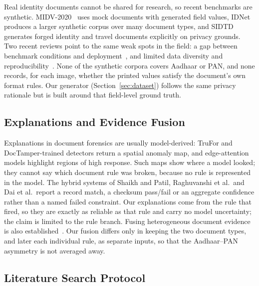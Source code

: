 \documentclass[conference]{IEEEtran}
\begin{document}
Real identity documents cannot be shared for research, so recent
benchmarks are synthetic. MIDV-2020~\cite{midv} uses mock documents with
generated field values, IDNet~\cite{idnet} produces a larger synthetic
corpus over many document types, and SIDTD~\cite{sidtd} generates
forged identity and travel documents explicitly on privacy grounds.
Two recent reviews point to the same weak spots in the field: a gap
between benchmark conditions and deployment~\cite{survey}, and limited
data diversity and reproducibility~\cite{zhang}. None of the synthetic
corpora covers Aadhaar or PAN, and none records, for each image,
whether the printed values satisfy the document's own format rules. Our
generator (Section~\ref{sec:dataset}) follows the same privacy
rationale but is built around that field-level ground truth.

\subsection{Explanations and Evidence Fusion}

Explanations in document forensics are usually model-derived: TruFor and
DocTamper-trained detectors return a spatial anomaly map, and
edge-attention models highlight regions of high response. Such maps
show where a model looked; they cannot say which document rule was
broken, because no rule is represented in the model. The hybrid systems
of Shaikh and Patil, Raghuvanshi et al.\ and Dai et al.\ report a
record match, a checksum pass/fail or an aggregate confidence rather
than a named failed constraint. Our explanations come from the rule that
fired, so they are exactly as reliable as that rule and carry no model
uncertainty; the claim is limited to the rule branch. Fusing
heterogeneous document evidence is also established~\cite{dai}. Our
fusion differs only in keeping the two document types, and later each
individual rule, as separate inputs, so that the Aadhaar--PAN asymmetry
is not averaged away.

\subsection{Literature Search Protocol}
\label{sec:search-protocol}
\end{document}
